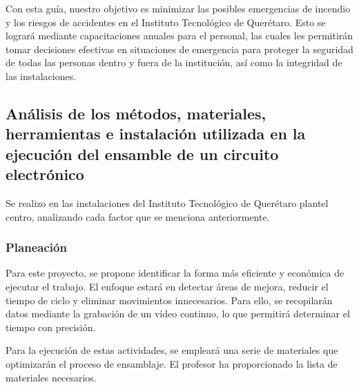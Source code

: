     
    Con esta guía, nuestro objetivo es minimizar las posibles emergencias de incendio y los riesgos de accidentes en el Instituto Tecnológico de Querétaro. Esto se logrará mediante capacitaciones anuales para el personal, las cuales les permitirán tomar decisiones efectivas en situaciones de emergencia para proteger la seguridad de todas las personas dentro y fuera de la institución, así como la integridad de las instalaciones.
    \subsection{Análisis de los métodos, materiales, herramientas e instalación utilizada en la ejecución del ensamble de un circuito electrónico}
    
    Se realizo en las instalaciones del Instituto Tecnológico de Querétaro plantel centro, analizando cada factor que se menciona anteriormente. 
    
    \subsubsection{Planeación}
    
    Para este proyecto, se propone identificar la forma más eficiente y económica de ejecutar el trabajo. El enfoque estará en detectar áreas de mejora, reducir el tiempo de ciclo y eliminar movimientos innecesarios. Para ello, se recopilarán datos mediante la grabación de un vídeo continuo, lo que permitirá determinar el tiempo con precisión.
    
    Para la ejecución de estas actividades, se empleará una serie de materiales que optimizarán el proceso de ensamblaje. El profesor ha proporcionado la lista de materiales necesarios.
    
